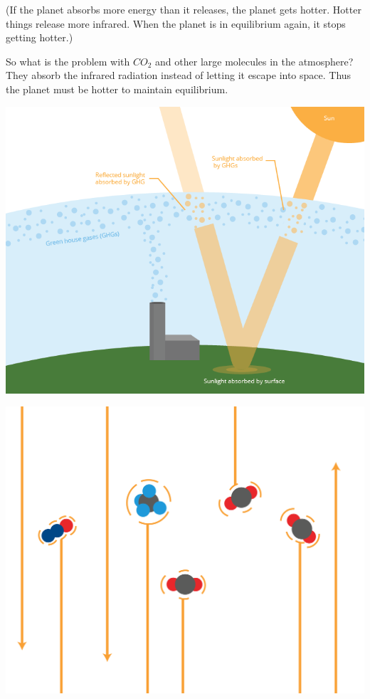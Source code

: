 (If the planet absorbs more energy than it releases, the planet gets
hotter.  Hotter things release more infrared. When the planet is in
equilibrium again, it stops getting hotter.)

So what is the problem with $CO_2$ and other large molecules in the
atmosphere? They absorb the infrared radiation instead of letting it
escape into space. Thus the planet must be hotter to maintain
equilibrium.

\includegraphics[width=1\textwidth]{ghgEffect.png}

\includegraphics[width=1\textwidth]{ghgClose.png}

